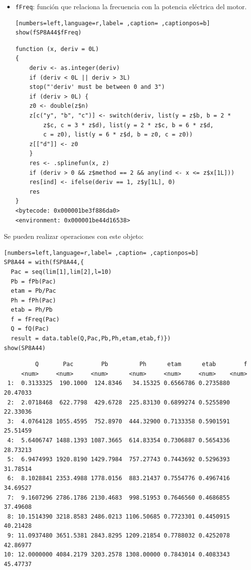 \begin{itemize}
\begin{itemize}
\item \texttt{fFreq}: función que relaciona la frecuencia con la potencia eléctrica del motor.
\begin{lstlisting}[numbers=left,language=r,label= ,caption= ,captionpos=b]
show(fSP8A44$fFreq)
\end{lstlisting}

\begin{verbatim}
function (x, deriv = 0L) 
{
    deriv <- as.integer(deriv)
    if (deriv < 0L || deriv > 3L) 
	stop("'deriv' must be between 0 and 3")
    if (deriv > 0L) {
	z0 <- double(z$n)
	z[c("y", "b", "c")] <- switch(deriv, list(y = z$b, b = 2 * 
	    z$c, c = 3 * z$d), list(y = 2 * z$c, b = 6 * z$d, 
	    c = z0), list(y = 6 * z$d, b = z0, c = z0))
	z[["d"]] <- z0
    }
    res <- .splinefun(x, z)
    if (deriv > 0 && z$method == 2 && any(ind <- x <= z$x[1L])) 
	res[ind] <- ifelse(deriv == 1, z$y[1L], 0)
    res
}
<bytecode: 0x000001be3f886da0>
<environment: 0x000001be44d16538>
\end{verbatim}
\end{itemize}

Se pueden realizar operaciones con este objeto:
\begin{lstlisting}[numbers=left,language=r,label= ,caption= ,captionpos=b]
SP8A44 = with(fSP8A44,{
  Pac = seq(lim[1],lim[2],l=10)
  Pb = fPb(Pac)
  etam = Pb/Pac
  Ph = fPh(Pac)
  etab = Ph/Pb
  f = fFreq(Pac)
  Q = fQ(Pac)
  result = data.table(Q,Pac,Pb,Ph,etam,etab,f)})
show(SP8A44)
\end{lstlisting}

\begin{verbatim}
	     Q       Pac        Pb         Ph      etam      etab        f
	 <num>     <num>     <num>      <num>     <num>     <num>    <num>
 1:  0.3133325  190.1000  124.8346   34.15325 0.6566786 0.2735880 20.47033
 2:  2.0718468  622.7798  429.6728  225.83130 0.6899274 0.5255890 22.33036
 3:  4.0764128 1055.4595  752.8970  444.32900 0.7133358 0.5901591 25.51459
 4:  5.6406747 1488.1393 1087.3665  614.83354 0.7306887 0.5654336 28.73213
 5:  6.9474993 1920.8190 1429.7984  757.27743 0.7443692 0.5296393 31.78514
 6:  8.1028841 2353.4988 1778.0156  883.21437 0.7554776 0.4967416 34.69527
 7:  9.1607296 2786.1786 2130.4683  998.51953 0.7646560 0.4686855 37.49608
 8: 10.1514390 3218.8583 2486.0213 1106.50685 0.7723301 0.4450915 40.21428
 9: 11.0937480 3651.5381 2843.8295 1209.21854 0.7788032 0.4252078 42.86977
10: 12.0000000 4084.2179 3203.2578 1308.00000 0.7843014 0.4083343 45.47737
\end{verbatim}


\end{itemize}
